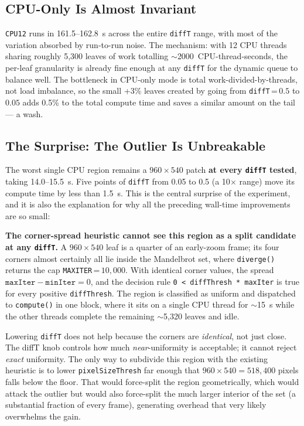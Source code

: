 \documentclass[
	english,
	letterpaper, oneside
]{article}
\begin{document}
\subsection{CPU-Only Is Almost Invariant}

\texttt{CPU12} runs in 161.5--162.8~s across the entire \texttt{diffT}
range, with most of the variation absorbed by run-to-run noise. The
mechanism: with 12 CPU threads sharing roughly 5{,}300 leaves of work
totalling $\sim$2000~CPU-thread-seconds, the per-leaf granularity is
already fine enough at any \texttt{diffT} for the dynamic queue to
balance well. The bottleneck in CPU-only mode is total
work-divided-by-threads, not load imbalance, so the small +3\% leaves
created by going from \texttt{diffT}\,=\,$0.5$ to $0.05$ adds 0.5\%
to the total compute time and saves a similar amount on the tail --- a
wash.

\subsection{The Surprise: The Outlier Is Unbreakable}

The worst single CPU region remains a $960 \times 540$ patch
\textbf{at every \texttt{diffT} tested}, taking 14.0--15.5~s. Five
points of \texttt{diffT} from 0.05 to 0.5 (a 10$\times$ range) move
its compute time by less than 1.5~s. This is the central surprise of
the experiment, and it is also the explanation for why all the
preceding wall-time improvements are so small:

\textbf{The corner-spread heuristic cannot see this region as a split
candidate at any \texttt{diffT}.} A $960 \times 540$ leaf is a quarter
of an early-zoom frame; its four corners almost certainly all lie
inside the Mandelbrot set, where \texttt{diverge()} returns the cap
\texttt{MAXITER}\,=\,$10{,}000$. With identical corner values, the
spread $\texttt{maxIter} - \texttt{minIter} = 0$, and the decision
rule \texttt{0 < diffThresh * maxIter} is true for every positive
\texttt{diffThresh}. The region is classified as uniform and dispatched
to \texttt{compute()} in one block, where it sits on a single CPU
thread for $\sim$15~s while the other threads complete the remaining
$\sim$5{,}320 leaves and idle.

Lowering \texttt{diffT} does not help because the corners are
\emph{identical}, not just close. The diffT knob controls how much
\emph{near}-uniformity is acceptable; it cannot reject \emph{exact}
uniformity. The only way to subdivide this region with the existing
heuristic is to lower \texttt{pixelSizeThresh} far enough that
$960 \times 540 = 518{,}400$ pixels falls below the floor. That would
force-split the region geometrically, which would attack the outlier
but would also force-split the much larger interior of the set (a
substantial fraction of every frame), generating overhead that very
likely overwhelms the gain.
\end{document}
